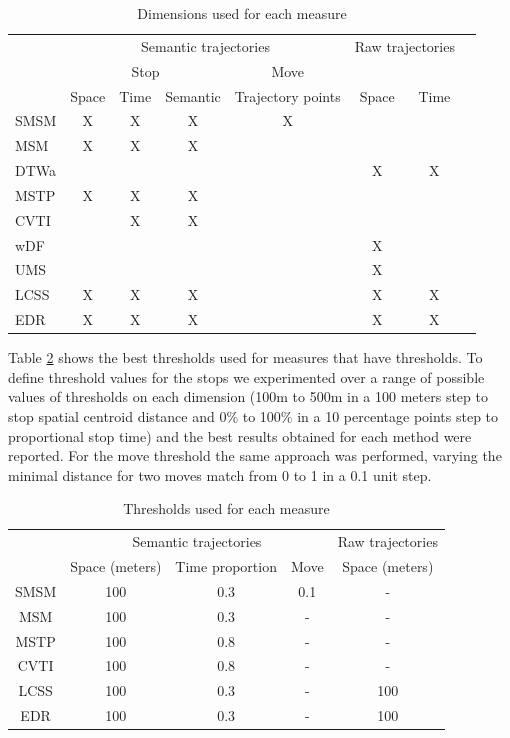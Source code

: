 \documentclass[12pt]{article}
\begin{document}
\begin{table}[!h]
\scriptsize
  \centering
  \begin{tabular}{|l|c|c|c|c|c|c|c|}
  	\hline
  & \multicolumn{4}{c|}{Semantic trajectories} & \multicolumn{2}{c|}{Raw trajectories} \\
 	\cline{2-5}
  & \multicolumn{3}{c|}{Stop} & \multicolumn{1}{c|}{Move} & \multicolumn{2}{c|}{} \\
 	\cline{2-7}
  & Space & Time & Semantic & Trajectory points & Space & Time\\
  	\hline
 SMSM & X & X & X & X & & \\
 MSM & X & X & X & & & \\
 DTWa &  &  &  & & X & X \\
 MSTP & X & X & X & & & \\
 CVTI & & X & X & & & \\
 wDF & & & & & X & \\
 UMS & & & & & X & \\
 LCSS & X & X & X & & X & X \\
 EDR & X & X & X & & X & X \\
    \hline
  \end{tabular}
  \caption{Dimensions used for each measure}
  \label{tab:san_francisco_measures}
\end{table}

Table \ref{tab:san_francisco_thresholds} shows the best thresholds used for measures that have thresholds. To define threshold values for the stops we experimented over a range of possible values of thresholds on each dimension (100m to 500m in a 100 meters step to stop spatial centroid distance and 0\% to 100\% in a 10 percentage points step to proportional stop time) and the best results obtained for each method were reported. For the move threshold the same approach was performed, varying the minimal distance for two moves match from 0 to 1 in a 0.1 unit step.

\begin{table}[!h]
\scriptsize
  \centering
  \begin{tabular}{|c|c|c|c|c|}
  	\hline
  & \multicolumn{3}{c|}{Semantic trajectories} & \multicolumn{1}{c|}{Raw trajectories} \\
 	\cline{2-5}
  & Space (meters) & Time proportion & Move & Space (meters) \\
  	\hline
 SMSM & 100 & 0.3 & 0.1 & - \\
 MSM & 100 & 0.3 & - & - \\
 MSTP & 100 & 0.8 & - & -  \\
 CVTI & 100 & 0.8 & - & -  \\
 LCSS & 100 & 0.3 & - & 100 \\
 EDR & 100 & 0.3 & - & 100 \\
    \hline
  \end{tabular}
  \caption{Thresholds used for each measure}
  \label{tab:san_francisco_thresholds}
\end{table}
\end{document}

